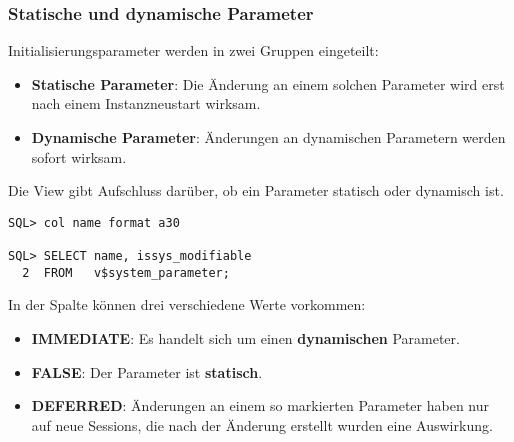         \subsubsection{Statische und dynamische Parameter}
          Initialisierungsparameter werden in zwei Gruppen eingeteilt:
          \begin{itemize}
            \item \textbf{Statische Parameter}: Die \"Anderung an einem solchen Parameter wird erst nach einem Instanzneustart wirksam.
            \item \textbf{Dynamische Parameter}: \"Anderungen an dynamischen Parametern werden sofort wirksam.
          \end{itemize}
          Die View  gibt Aufschluss dar\"uber, ob ein Parameter statisch oder dynamisch ist.
          \begin{lstlisting}[caption={Unterscheiden zwischen dynamischen und statischen Parametern},label=admin14,language=oracle_sql,alsolanguage=sqlplus]
SQL> col name format a30

SQL> SELECT name, issys_modifiable
  2  FROM   v$system_parameter;
          \end{lstlisting}
          In der Spalte  k\"onnen drei verschiedene Werte vorkommen:
          \begin{itemize}
            \item \textbf{IMMEDIATE}: Es handelt sich um einen \textbf{dynamischen} Parameter.
            \item \textbf{FALSE}: Der Parameter ist \textbf{statisch}.
            \item \textbf{DEFERRED}: \"Anderungen an einem so markierten Parameter haben nur auf neue Sessions, die nach der \"Anderung erstellt wurden eine Auswirkung.
          \end{itemize}
